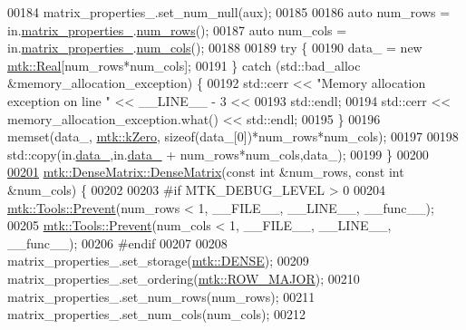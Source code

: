 \begin{DoxyCode}
00184   matrix\_properties\_.set\_num\_null(aux);
00185 
00186   \textcolor{keyword}{auto} num\_rows = in.\hyperlink{classmtk_1_1DenseMatrix_a481c8d09af685a5ba67acefdcaa810cc}{matrix\_properties\_}.\hyperlink{classmtk_1_1Matrix_a69feb30fc0018faee65fe9f7cb43e0ed}{num\_rows}();
00187   \textcolor{keyword}{auto} num\_cols = in.\hyperlink{classmtk_1_1DenseMatrix_a481c8d09af685a5ba67acefdcaa810cc}{matrix\_properties\_}.\hyperlink{classmtk_1_1Matrix_a1e52243fa290de6ee4bcc48cd1776a9a}{num\_cols}();
00188 
00189   \textcolor{keywordflow}{try} \{
00190     data\_ = \textcolor{keyword}{new} \hyperlink{group__c01-roots_gac080bbbf5cbb5502c9f00405f894857d}{mtk::Real}[num\_rows*num\_cols];
00191   \} \textcolor{keywordflow}{catch} (std::bad\_alloc &memory\_allocation\_exception) \{
00192     std::cerr << \textcolor{stringliteral}{"Memory allocation exception on line "} << \_\_LINE\_\_ - 3 <<
00193       std::endl;
00194     std::cerr << memory\_allocation\_exception.what() << std::endl;
00195   \}
00196   memset(data\_, \hyperlink{group__c01-roots_ga59a451a5fae30d59649bcda274fea271}{mtk::kZero}, \textcolor{keyword}{sizeof}(data\_[0])*num\_rows*num\_cols);
00197 
00198   std::copy(in.\hyperlink{classmtk_1_1DenseMatrix_a7893e4e5c8d2e2de32b156177e78cb6f}{data\_},in.\hyperlink{classmtk_1_1DenseMatrix_a7893e4e5c8d2e2de32b156177e78cb6f}{data\_} + num\_rows*num\_cols,data\_);
00199 \}
00200 
\hypertarget{mtk__dense__matrix_8cc_source_l00201}{}\hyperlink{classmtk_1_1DenseMatrix_abe26c623467fc1b293cf4f22a3a47cc8}{00201} \hyperlink{classmtk_1_1DenseMatrix_a0c75ee704707983f935b02835eab0933}{mtk::DenseMatrix::DenseMatrix}(\textcolor{keyword}{const} \textcolor{keywordtype}{int} &num\_rows, \textcolor{keyword}{const} \textcolor{keywordtype}{int} &num\_cols) \{
00202 
00203 \textcolor{preprocessor}{  #if MTK\_DEBUG\_LEVEL > 0}
00204   \hyperlink{classmtk_1_1Tools_afe5bb096309258e2e72503fd7b41c7e0}{mtk::Tools::Prevent}(num\_rows < 1, \_\_FILE\_\_, \_\_LINE\_\_, \_\_func\_\_);
00205   \hyperlink{classmtk_1_1Tools_afe5bb096309258e2e72503fd7b41c7e0}{mtk::Tools::Prevent}(num\_cols < 1, \_\_FILE\_\_, \_\_LINE\_\_, \_\_func\_\_);
00206 \textcolor{preprocessor}{  #endif}
00207 
00208   matrix\_properties\_.set\_storage(\hyperlink{namespacemtk_ga25b67ec6a2afeee69f9bb196a9c66619a00a806d43a7d74e9ccca47a2134e9c87}{mtk::DENSE});
00209   matrix\_properties\_.set\_ordering(\hyperlink{namespacemtk_ga622801bd9f912d0f976c3e383f5f581cabc55178ac16eb1ce89b5f3ab915a91f3}{mtk::ROW\_MAJOR});
00210   matrix\_properties\_.set\_num\_rows(num\_rows);
00211   matrix\_properties\_.set\_num\_cols(num\_cols);
00212 

\end{DoxyCode}
